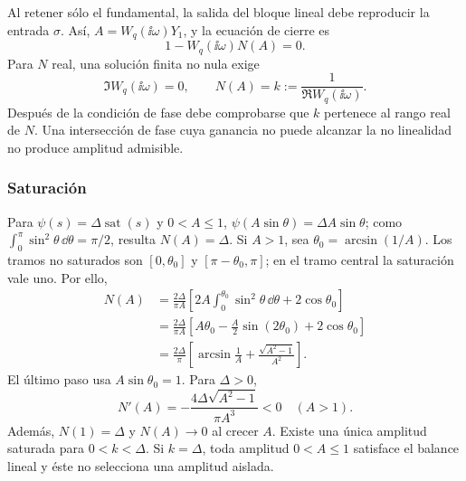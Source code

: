 Al retener sólo el fundamental, la salida del bloque lineal debe
reproducir la entrada \(\sigma\). Así,
\(A=W_q(\ii\omega)Y_1\), y la ecuación de cierre es
\begin{equation}
 1-W_q(\ii\omega)N(A)=0.
 \label{bre:bal:physical-closure}
\end{equation}
Para \(N\) real, una solución finita no nula exige
\begin{equation}
 \Im W_q(\ii\omega)=0,\qquad
 N(A)=k:=\frac1{\Re W_q(\ii\omega)}.
 \label{bre:bal:phase-gain}
\end{equation}
Después de la condición de fase debe comprobarse que \(k\) pertenece al
rango real de \(N\). Una intersección de fase cuya ganancia no puede
alcanzar la no linealidad no produce amplitud admisible.

\subsubsection{Saturación}
Para \(\psi(s)=\Delta\operatorname{sat}(s)\) y \(0<A\leq1\),
\(\psi(A\sin\theta)=\Delta A\sin\theta\); como
\(\int_0^\pi\sin^2\theta\,\dd\theta=\pi/2\), resulta
\(N(A)=\Delta\). Si \(A>1\), sea
\(\theta_0=\arcsin(1/A)\). Los tramos no saturados son
\([0,\theta_0]\) y \([\pi-\theta_0,\pi]\); en el tramo central la
saturación vale uno. Por ello,
\begin{equation}
 \begin{aligned}
 N(A)&=\frac{2\Delta}{\pi A}
 \left[2A\int_0^{\theta_0}\sin^2\theta\,\dd\theta
       +2\cos\theta_0\right]\\
 &=\frac{2\Delta}{\pi A}
 \left[A\theta_0-\frac A2\sin(2\theta_0)+2\cos\theta_0\right]\\
 &=\frac{2\Delta}{\pi}
 \left[\arcsin\frac1A+\frac{\sqrt{A^2-1}}{A^2}\right].
 \end{aligned}
 \label{bre:bal:saturation-df}
\end{equation}
El último paso usa \(A\sin\theta_0=1\). Para \(\Delta>0\),
\begin{equation}
 N'(A)=-\frac{4\Delta\sqrt{A^2-1}}{\pi A^3}<0
 \quad(A>1).
 \label{bre:bal:saturation-derivative}
\end{equation}
Además, \(N(1)=\Delta\) y \(N(A)\to0\) al crecer \(A\).
Existe una única amplitud saturada para \(0<k<\Delta\). Si
\(k=\Delta\), toda amplitud \(0<A\leq1\) satisface el balance lineal
y éste no selecciona una amplitud aislada.


